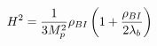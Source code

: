 \begin{equation}
H^2={1 \over 3M_p^2} \rho_{BI} \left(1+{\rho_{BI} \over 2\lambda_b} \right)
\label{friedman}
\end{equation}


